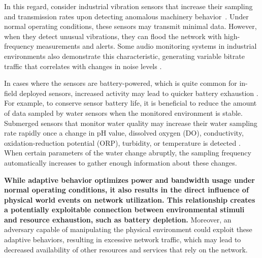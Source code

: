 In this regard, consider industrial vibration sensors that increase their sampling and transmission rates upon detecting anomalous machinery behavior~\cite{yin2023adaptive}. 
Under normal operating conditions, these sensors may transmit minimal data. However, when they detect unusual vibrations, they can flood the network with high-frequency measurements and alerts.
Some audio monitoring systems in industrial environments also demonstrate this characteristic, generating variable bitrate traffic that correlates with changes in noise levels \cite{AudioSampling2010}.

In cases where the sensors are battery-powered, which is quite common for in-field deployed sensors, increased activity may lead to quicker battery exhaustion \cite{Harb2018Energy-Efficient}. 
For example, to conserve sensor battery life, it is beneficial to reduce the amount of data sampled by water sensors when the monitored environment is stable. 
Submerged sensors that monitor water quality may increase their water sampling rate rapidly once a change in pH value, dissolved oxygen (DO), conductivity, oxidation-reduction potential (ORP), turbidity, or temperature is detected \cite{waterSampling2017}. When certain parameters of the water change abruptly, the sampling frequency automatically increases to gather enough information about these changes.


\textbf{While adaptive behavior optimizes power and bandwidth usage under normal operating conditions, it also results in the direct influence of physical world events on network utilization. 
This relationship creates a potentially exploitable connection between environmental stimuli and resource exhaustion, such as battery depletion.} 
Moreover, an adversary capable of manipulating the physical environment could exploit these adaptive behaviors, resulting in excessive network traffic, which may lead to decreased availability of other resources and services that rely on the network.